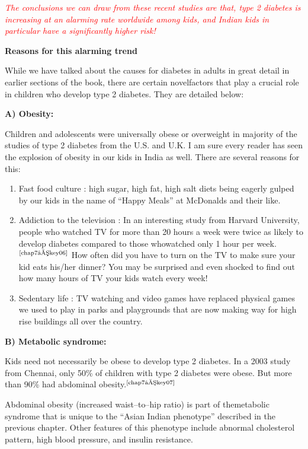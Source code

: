 \textcolor{red}{\textit{The conclusions we can draw from these recent studies are that, type 2 diabetes is increasing at an alarming rate worldwide among kids, and Indian kids in particular have a significantly higher risk!}}

\noindent\textbf{Reasons for this alarming trend}

While we have talked about the causes for diabetes in adults in great detail in earlier sections of the book, there are certain novel\break factors that play a crucial role in children who develop type 2 diabetes. They are detailed below:

\noindent\textbf{A) Obesity:}

Children and adolescents were universally obese or overweight in majority of the studies of type 2 diabetes from the U.S. and U.K. I am sure every reader has seen the explosion of obesity in our kids in India as well. There are several reasons for this:

\vspace{-\topsep}
\begin{enumerate}[•]
\itemsep=0pt
\item Fast food culture : high sugar, high fat, high salt diets being eagerly gulped by our kids in the name of “Happy Meals” at McDonalds and their like.
\item Addiction to the television : In an interesting study from Harvard University, people who watched TV for more than 20 hours a week were twice as likely to develop diabetes compared to those who\break watched only 1 hour per week.$^{\text{\cite{chap7–key06}}}$ How often did you have to turn on the TV to make sure your kid eats his/her dinner? You may be surprised and even shocked to find out how many hours of TV your kids watch every week!
\item Sedentary life : TV watching and video games have replaced physical games we used to play in parks and playgrounds that are now making way for high rise buildings all over the country.
 \end{enumerate}
 \vspace{-\topsep}

\noindent\textbf{B) Metabolic syndrome:}

Kids need not necessarily be obese to develop type 2 diabetes. In a 2003 study from Chennai, only 50\% of children with type 2 diabetes were obese. But more than 90\% had abdominal obesity.$^{\text{\cite{chap7–key07}}}$

Abdominal obesity (increased waist–to–hip ratio) is part of the\break metabolic syndrome that is unique to the “Asian Indian phenotype” described in the previous chapter. Other features of this phenotype include abnormal cholesterol pattern, high blood pressure, and insulin resistance.

